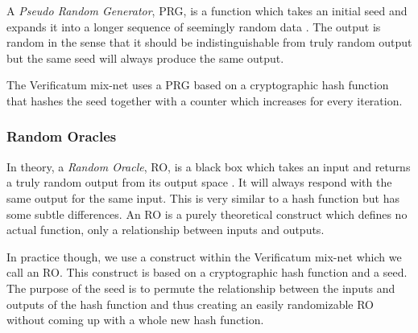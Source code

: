 A \emph{Pseudo Random Generator}, PRG, is a function which takes an
initial seed and expands it into a longer sequence of seemingly random
data \cite[p.~170]{hac}. The output is random in the sense that it should be
indistinguishable from truly random output but the same seed will
always produce the same output.

The Verificatum mix-net uses a PRG based on a cryptographic hash
function that hashes the seed together with a counter which increases
for every iteration.

\subsubsection{Random Oracles}

In theory, a \emph{Random Oracle}, RO, is a black box which takes an
input and returns a truly random output from its output space
\cite{oracle}. It will always respond with the same output for the
same input. This is very similar to a hash function but has some
subtle differences. An RO is a purely theoretical construct which
defines no actual function, only a relationship between inputs and
outputs.

In practice though, we use a construct within the Verificatum mix-net
which we call an RO. This construct is based on a cryptographic hash
function and a seed. The purpose of the seed is to permute the
relationship between the inputs and outputs of the hash function and
thus creating an easily randomizable RO without coming up with a whole
new hash function.
